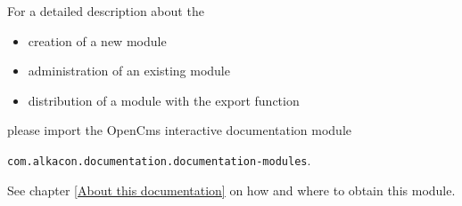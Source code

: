 For a detailed description about the

\begin{itemize}

\item creation of a new module

\item administration of an existing module

\item distribution of a module with the export function 

\end{itemize}

please import the OpenCms interactive documentation module

{\tt com.alkacon.documentation.documentation-modules}.

See chapter \ref{About this documentation} on how and where to obtain this module.